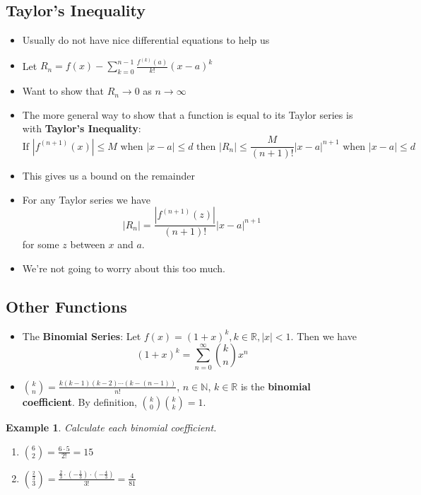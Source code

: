 \documentclass[letterpaper, 11pt, openany]{book}
\theoremstyle{mytheoremstyle}
\theoremstyle{myexamplestyle}
\newtheorem{example}{Example}[section]
\begin{document}
\subsection{Taylor's Inequality}
\begin{itemize}
    \item Usually do not have nice differential equations to help us \faMeh
    \item Let $\displaystyle R_{n} = f(x) - \sum_{k=0}^{n-1} \frac{f^{(k)}(a)}{k!} (x-a)^k$
    \item Want to show that $R_{n} \to 0$ as $n \to \infty$
    \item The more general way to show that a function is equal to its Taylor series is with \textbf{Taylor's Inequality}:
    \[\text{If } \left| f^{(n+1)}(x) \right| \leq M \text{ when } |x - a| \leq d \text{ then } |R_{n}| \leq \frac{M}{(n+1)!}|x - a|^{n+1} \text{ when } |x - a| \leq d\]
    \item This gives us a bound on the remainder
    \item For any Taylor series we have
    \[|R_{n}| = \frac{|f^{(n+1)}(z)|}{(n+1)!}|x-a|^{n+1}    \]
    for some $z$ between $x$ and $a$.
    \item We're not going to worry about this too much.
\end{itemize}

\subsection{Other Functions}
\begin{itemize}
    \item The \textbf{Binomial Series}: Let $f(x) = (1+x)^{k}, k \in \mathbb{R}, |x| < 1$. Then we have
    \[(1 + x)^{k} = \sum_{n = 0}^{\infty} \binom{k}{n} x^{n} \]
    \item $\displaystyle \binom{k}{n} = \frac{k(k-1)(k-2)\cdots (k-(n-1))}{n!}$, $n \in \mathbb{N}$, $k \in \mathbb{R}$ is the \textbf{binomial coefficient}. By definition, \(\binom{k}{0} \binom{k}{k}= 1\).
\end{itemize}

\begin{example}\label{e:binomial-coefficients}
    Calculate each binomial coefficient.
    \begin{enumerate}[label=\textbf{\alph*.}]
        \item $\displaystyle \binom{6}{2} = \frac{6\cdot 5}{2!} = 15$
        \item $\displaystyle \binom{\frac{2}{3}}{3} = \frac{\frac{2}{3} \cdot \left( -\frac{1}{3} \right) \cdot \left( -\frac{4}{3} \right)}{3!} = \frac{4}{81}$
    \end{enumerate}
\end{example}
\end{document}
